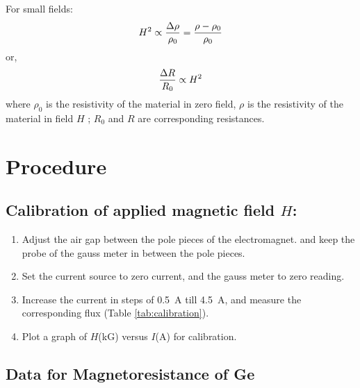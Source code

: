 	For small fields:
	\begin{equation}{\label{eqn:H2}}
		H^2 \propto \dfrac{\Delta \rho}{\rho_0} = \dfrac{\rho-\rho_0}{\rho_0}
	\end{equation}
	or,
	\begin{equation}{\label{eqn:H2-prop}}
		\dfrac{\Delta R}{R_0} \propto H^2
	\end{equation}
	where $ \rho_0 $ is the resistivity of the material in zero field, $ \rho $ is the resistivity of the material in field $ H $ ; $ R_0 $ and $ R $ are corresponding resistances.
	
\section{Procedure}

\subsection{Calibration of applied magnetic field $ H $:}
\label{subs:calib}

\begin{enumerate}
	\item 	Adjust the air gap between the pole pieces of the electromagnet.
	and keep the probe of the gauss meter in between the pole pieces.
	
	\item 	Set the current source to zero current, and the gauss meter to zero reading.
	
	\item	Increase the current in steps of \SI{0.5}{\ampere} till \SI{4.5}{\ampere}, and measure the corresponding flux (Table \ref{tab:calibration}).
	
	\item 	Plot a graph of $ H $(\si{\kilo G}) versus $ I $(\si{\ampere}) for calibration.
\end{enumerate}

\subsection{Data for Magnetoresistance of Ge}
\label{subs:data}

